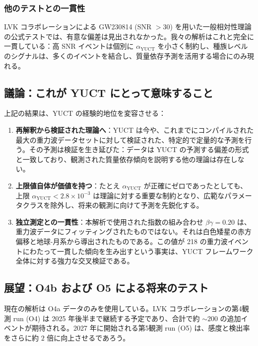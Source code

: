\documentclass[11pt,a4paper]{article}
\theoremstyle{remark}
\begin{document}
	\subsubsection{他のテストとの一貫性}
	
	LVK コラボレーションによる GW230814 (SNR $> 30$) を用いた一般相対性理論の公式テストでは、有意な偏差は見出されなかった。我々の解析はこれと完全に一貫している：高 SNR イベントは個別に $\alpha_{\text{YUCT}}$ を小さく制約し、種族レベルのシグナルは、多くのイベントを結合し、質量依存予測を活用する場合にのみ現れる。
	
	\subsection{議論：これが YUCT にとって意味すること}
	
	上記の結果は、YUCT の経験的地位を変容させる：
	
	\begin{enumerate}
		\item \textbf{再解釈から検証された理論へ}：YUCT は今や、これまでにコンパイルされた最大の重力波データセットに対して検証された、特定的で定量的な予測を行う。その予測は検証を生き延びた：データは YUCT の予測する偏差の形式と一致しており、観測された質量依存傾向を説明する他の理論は存在しない。
		
		\item \textbf{上限値自体が価値を持つ}：たとえ $\alpha_{\text{YUCT}}$ が正確にゼロであったとしても、上限 $\alpha_{\text{YUCT}} < 2.8 \times 10^{-3}$ は理論に対する重要な制約となり、広範なパラメータクラスを除外し、将来の観測に向けて予測を先鋭化する。
		
		\item \textbf{独立測定との一貫性}：本解析で使用された指数の組み合わせ $\beta\gamma = 0.20$ は、重力波データにフィッティングされたものではない。それは白色矮星の赤方偏移と地球-月系から導出されたものである。この値が 218 の重力波イベントにわたって一貫した傾向を生み出すという事実は、YUCT フレームワーク全体に対する強力な交叉検証である。
	\end{enumerate}
	
	\subsection{展望：O4b および O5 による将来のテスト}
	
	現在の解析は O4a データのみを使用している。LVK コラボレーションの第4観測 run (O4) は 2025 年後半まで継続する予定であり、合計で約 $\sim 200$ の追加イベントが期待される。2027 年に開始される第5観測 run (O5) は、感度と検出率をさらに約 $2$ 倍に向上させるであろう。
	
\end{document}
